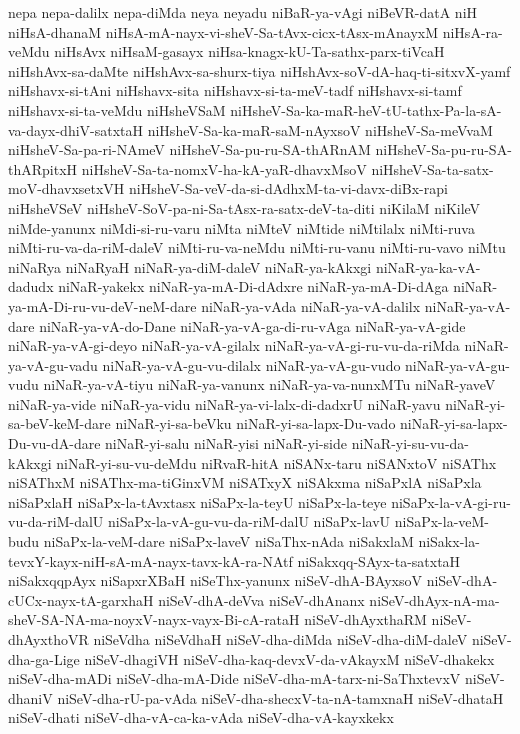 {nepa
nepa-dalilx
nepa-diMda
neya
neyadu
niBaR-ya-vAgi
niBeVR-datA
niH
niHsA-dhanaM
niHsA-mA-nayx-vi-sheV-Sa-tAvx-cicx-tAsx-mAnayxM
niHsA-ra-veMdu
niHsAvx
niHsaM-gasayx
niHsa-knagx-kU-Ta-sathx-parx-tiVcaH
niHshAvx-sa-daMte
niHshAvx-sa-shurx-tiya
niHshAvx-soV-dA-haq-ti-sitxvX-yamf
niHshavx-si-tAni
niHshavx-sita
niHshavx-si-ta-meV-tadf
niHshavx-si-tamf
niHshavx-si-ta-veMdu
niHsheVSaM
niHsheV-Sa-ka-maR-heV-tU-tathx-Pa-la-sA-va-dayx-dhiV-satxtaH
niHsheV-Sa-ka-maR-saM-nAyxsoV
niHsheV-Sa-meVvaM
niHsheV-Sa-pa-ri-NAmeV
niHsheV-Sa-pu-ru-SA-thARnAM
niHsheV-Sa-pu-ru-SA-thARpitxH
niHsheV-Sa-ta-nomxV-ha-kA-yaR-dhavxMsoV
niHsheV-Sa-ta-satx-moV-dhavxsetxVH
niHsheV-Sa-veV-da-si-dAdhxM-ta-vi-davx-diBx-rapi
niHsheVSeV
niHsheV-SoV-pa-ni-Sa-tAsx-ra-satx-deV-ta-diti
niKilaM
niKileV
niMde-yanunx
niMdi-si-ru-varu
niMta
niMteV
niMtide
niMtilalx
niMti-ruva
niMti-ru-va-da-riM-daleV
niMti-ru-va-neMdu
niMti-ru-vanu
niMti-ru-vavo
niMtu
niNaRya
niNaRyaH
niNaR-ya-diM-daleV
niNaR-ya-kAkxgi
niNaR-ya-ka-vA-dadudx
niNaR-yakekx
niNaR-ya-mA-Di-dAdxre
niNaR-ya-mA-Di-dAga
niNaR-ya-mA-Di-ru-vu-deV-neM-dare
niNaR-ya-vAda
niNaR-ya-vA-dalilx
niNaR-ya-vA-dare
niNaR-ya-vA-do-Dane
niNaR-ya-vA-ga-di-ru-vAga
niNaR-ya-vA-gide
niNaR-ya-vA-gi-deyo
niNaR-ya-vA-gilalx
niNaR-ya-vA-gi-ru-vu-da-riMda
niNaR-ya-vA-gu-vadu
niNaR-ya-vA-gu-vu-dilalx
niNaR-ya-vA-gu-vudo
niNaR-ya-vA-gu-vudu
niNaR-ya-vA-tiyu
niNaR-ya-vanunx
niNaR-ya-va-nunxMTu
niNaR-yaveV
niNaR-ya-vide
niNaR-ya-vidu
niNaR-ya-vi-lalx-di-dadxrU
niNaR-yavu
niNaR-yi-sa-beV-keM-dare
niNaR-yi-sa-beVku
niNaR-yi-sa-lapx-Du-vado
niNaR-yi-sa-lapx-Du-vu-dA-dare
niNaR-yi-salu
niNaR-yisi
niNaR-yi-side
niNaR-yi-su-vu-da-kAkxgi
niNaR-yi-su-vu-deMdu
niRvaR-hitA
niSANx-taru
niSANxtoV
niSAThx
niSAThxM
niSAThx-ma-tiGinxVM
niSATxyX
niSAkxma
niSaPxlA
niSaPxla
niSaPxlaH
niSaPx-la-tAvxtasx
niSaPx-la-teyU
niSaPx-la-teye
niSaPx-la-vA-gi-ru-vu-da-riM-dalU
niSaPx-la-vA-gu-vu-da-riM-dalU
niSaPx-lavU
niSaPx-la-veM-budu
niSaPx-la-veM-dare
niSaPx-laveV
niSaThx-nAda
niSakxlaM
niSakx-la-tevxY-kayx-niH-sA-mA-nayx-tavx-kA-ra-NAtf
niSakxqq-SAyx-ta-satxtaH
niSakxqqpAyx
niSapxrXBaH
niSeThx-yanunx
niSeV-dhA-BAyxsoV
niSeV-dhA-cUCx-nayx-tA-garxhaH
niSeV-dhA-deVva
niSeV-dhAnanx
niSeV-dhAyx-nA-ma-sheV-SA-NA-ma-noyxV-nayx-vayx-Bi-cA-rataH
niSeV-dhAyxthaRM
niSeV-dhAyxthoVR
niSeVdha
niSeVdhaH
niSeV-dha-diMda
niSeV-dha-diM-daleV
niSeV-dha-ga-Lige
niSeV-dhagiVH
niSeV-dha-kaq-devxV-da-vAkayxM
niSeV-dhakekx
niSeV-dha-mADi
niSeV-dha-mA-Dide
niSeV-dha-mA-tarx-ni-SaThxtevxV
niSeV-dhaniV
niSeV-dha-rU-pa-vAda
niSeV-dha-shecxV-ta-nA-tamxnaH
niSeV-dhataH
niSeV-dhati
niSeV-dha-vA-ca-ka-vAda
niSeV-dha-vA-kayxkekx
}
